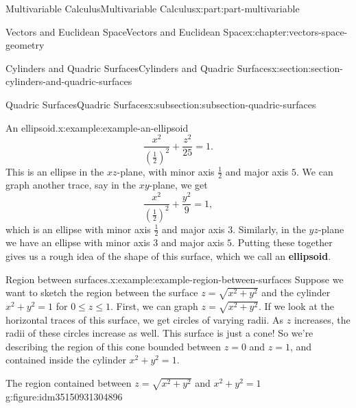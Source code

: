 \documentclass[twoside,10pt,]{tufte-book}
\newcommand{\terminology}[1]{\textbf{#1}}
\numberwithin{equation}{part}
\newlength{\qrsize}
\newlength{\previewwidth}
\begin{document}
\begin{partptx}{Multivariable Calculus}{}{Multivariable Calculus}{}{}{x:part:part-multivariable}
\begin{chapterptx}{Vectors and Euclidean Space}{}{Vectors and Euclidean Space}{}{}{x:chapter:vectors-space-geometry}
\begin{sectionptx}{Cylinders and Quadric Surfaces}{}{Cylinders and Quadric Surfaces}{}{}{x:section:section-cylinders-and-quadric-surfaces}
\begin{subsectionptx}{Quadric Surfaces}{}{Quadric Surfaces}{}{}{x:subsection:subsection-quadric-surfaces}
\begin{example}{An ellipsoid.}{x:example:example-an-ellipsoid}
%
\begin{equation*}
\frac{x^{2}}{(\frac{1}{2})^{2}}+\frac{z^{2}}{25} = 1.
\end{equation*}
This is an ellipse in the \(xz\)-plane, with minor axis \(\frac{1}{2}\) and major axis \(5\). We can graph another trace, say in the \(xy\)-plane, we get%
%
\begin{equation*}
\frac{x^{2}}{(\frac{1}{2})^{2}}+\frac{y^{2}}{9} = 1,
\end{equation*}
which is an ellipse with minor axis \(\frac{1}{2}\) and major axis \(3\). Similarly, in the \(yz\)-plane we have an ellipse with minor axis \(3\) and major axis \(5\). Putting these together gives us a rough idea of the shape of this surface, which we call an \terminology{ellipsoid}.%
\end{example}
\begin{example}{Region between surfaces.}{x:example:example-region-between-surfaces}%
Suppose we want to sketch the region between the surface \(z=\sqrt{x^{2}+y^{2}}\) and the cylinder \(x^{2}+y^{2}=1\) for \(0\leq z\leq 1\). First, we can graph \(z=\sqrt{x^{2}+y^{2}}\). If we look at the horizontal traces of this surface, we get circles of varying radii. As \(z\) increases, the radii of these circles increase as well. This surface is just a cone! So we're describing the region of this cone bounded between \(z=0\) and \(z=1\), and contained inside the cylinder \(x^{2}+y^{2}=1\).%
\end{example}
\begin{figureptx}{The region contained between \(z = \sqrt{x^2+y^2}\) and \(x^2+y^2=1\)}{g:figure:idm35150931304896}{}%
\centering
\setlength{\qrsize}{9em}
\setlength{\previewwidth}{\linewidth}
\addtolength{\previewwidth}{-\qrsize}
\begin{tcbraster}[raster columns=2, raster column skip=1pt, raster halign=center, raster force size=false, raster left skip=0pt, raster right skip=0pt]%
\begin{tcolorbox}[previewstyle, width=\previewwidth]%
%

\end{tcolorbox}
\end{tcbraster}
\end{figureptx}
\end{subsectionptx}
\end{sectionptx}
\end{chapterptx}
\end{partptx}
\end{document}

